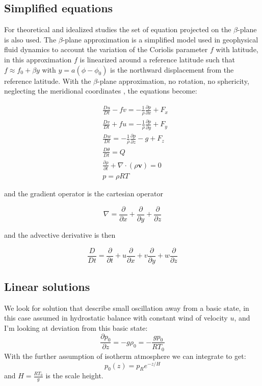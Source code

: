\subsection{Simplified equations}\label{summary-of-fundamental-equations}

For theoretical and idealized studies the set of equation projected on the \(\beta\)-plane is also used. The $\beta$-plane approximation is a simplified model used in geophysical fluid dynamics to account the variation of the Coriolis parameter $f$ with latitude, in this approximation $f$ is linearized around a reference latitude such that $f\approx f_0+\beta y$ with $y=a(\phi-\phi_0)$ is the northward displacement from the reference latitude. With the $\beta$-plane approximation, no rotation, no sphericity, neglecting the meridional coordinates , the equations become:

\[\begin{aligned}
&\frac{D u}{Dt} - fv  = -\frac{1}{\rho}\frac{\partial p}{\partial x}   + F_x \\
&\frac{D v}{Dt} + fu = -\frac{1}{\rho}\frac{\partial p}{\partial y}  + F_y \\
&\frac{D w}{Dt}  = -\frac{1}{\rho }\frac{\partial p}{\partial z} -g  + F_z \\
&\frac{D \theta}{Dt} = Q\\
&\frac{\partial \rho}{\partial t}+\nabla\cdot(\rho\mathbf{v}) = 0\\
&p = \rho R T
\end{aligned}\]

and the gradient operator is the cartesian operator

\[\nabla = \frac{\partial }{\partial x} + \frac{\partial }{\partial y} + \frac{\partial }{\partial z}\]

and the advective derivative is then

\[\frac{D }{Dt} = \frac{\partial }{\partial t} + u\frac{\partial }{\partial x} + v\frac{\partial }{\partial y} + w\frac{\partial }{\partial z}\]


\subsection{Linear solutions}
We look for solution that describe small oscillation away from a basic state, in this case assumed in hydrostatic balance with constant wind of velocity $u$, and I'm looking at deviation from this basic state: 
\begin{equation}
    \frac{\partial p_0}{\partial z}=-g\rho_0=-\frac{gp_0}{RT_0}
\end{equation}
With the further assumption of isotherm atmosphere we can integrate to get: 
\begin{equation}
    p_0(z)=p_Re^{-z/H}
\end{equation}
and $H=\frac{RT_0}{g}$ is the scale height. \\


